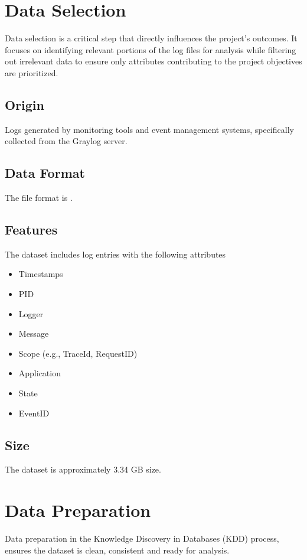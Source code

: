 \section{Data Selection}

Data selection is a critical step that directly influences the project’s outcomes. It focuses on identifying relevant portions of the log files for analysis while filtering out irrelevant data to ensure only attributes contributing to the project objectives are prioritized.

\subsection{Origin}
Logs generated by monitoring tools and event management systems, specifically collected from the Graylog server.

\subsection{Data Format}
The file format is .

\subsection{Features}
The dataset includes log entries with the following attributes
	\begin{itemize}
	\item Timestamps
	\item PID
	\item Logger
	\item Message
	\item Scope (e.g., TraceId, RequestID)
	\item Application
	\item State
	\item EventID
\end{itemize}

\subsection{Size}
The dataset is approximately 3.34 GB size.

\section{Data Preparation}
Data preparation in the Knowledge Discovery in Databases (KDD) process, ensures the dataset is clean, consistent and ready for analysis. 

